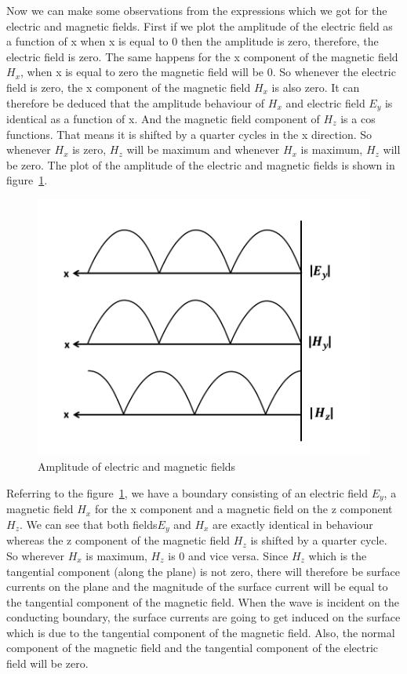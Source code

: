 Now we can make some observations from the expressions which we got for the electric and magnetic fields. First if we plot the amplitude of the electric field as a function of x when x is equal to 0 then the amplitude is zero, therefore, the electric field is zero. The same happens for the x component of the magnetic field $H_x$, when x is equal to zero the magnetic field will be 0. So whenever the electric field is zero, the x component of the magnetic field $H_x$ is also zero. It can therefore be deduced that the amplitude behaviour of $H_x$ and electric field $E_y$ is identical as a function of x. And the magnetic field component of $H_z$ is a cos functions. That means it is shifted by a quarter cycles in the x direction. So whenever $H_x$ is zero, $H_z$ will be maximum and whenever $H_x$ is maximum, $H_z$ will be zero. The plot of the amplitude of the electric and magnetic fields is shown in figure~\ref{fig:amplitude}.
\begin{figure}[h]
\centering
\includegraphics[width=1\linewidth]{./graphics/amplitude_of_electric_and_magnetic_fields.png}
\caption{Amplitude of electric and magnetic fields}
\label{fig:amplitude}
\end{figure}

Referring to the figure~\ref{fig:amplitude}, we have a boundary consisting of an electric field $E_y$, a magnetic field $H_x$ for the x component and a magnetic field on the z component $H_z$. We can see that both fields$ E_y$ and $H_x$ are exactly identical in behaviour whereas the z component of the magnetic field $H_z$ is shifted by a quarter cycle. So wherever $H_x$ is maximum, $H_z$ is 0 and vice versa. Since $H_z$ which is the tangential component (along the plane) is not zero, there will therefore be surface currents on the plane and the magnitude of the surface current will be equal to the tangential component of the magnetic field. When the wave is incident on the conducting boundary, the surface currents are going to get induced on the surface which is due to the tangential component of the magnetic field. Also, the normal component of the magnetic field and the tangential component of the electric field will be zero.

